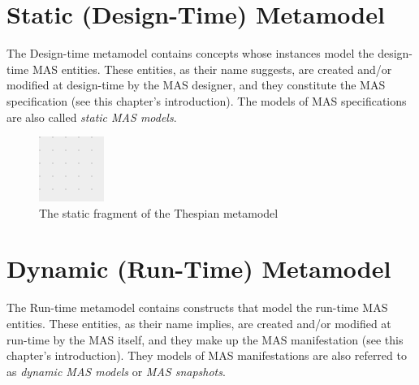 \section{Static (Design-Time) Metamodel}	

The Design-time metamodel contains concepts whose instances model the design-time MAS entities.
These entities, as their name suggests, are created and/or modified at design-time by the MAS designer, and they constitute the MAS specification (see this chapter's introduction).
The models of MAS specifications are also called \textit{static MAS models}.

\begin{figure}[ht]
	\centering
	\includegraphics[width=\textwidth]{images/thespian-static-metamodel.png}
	\caption{The static fragment of the Thespian metamodel}
	\label{figure:thespian-static-metamodel}
\end{figure}

\section{Dynamic (Run-Time) Metamodel}

The Run-time metamodel contains constructs that model the run-time MAS entities.
These entities, as their name implies, are created and/or modified at run-time by the MAS itself, and they make up the MAS manifestation (see this chapter's introduction).
They models of MAS manifestations are also referred to as \textit{dynamic MAS models} or \textit{MAS snapshots}.

